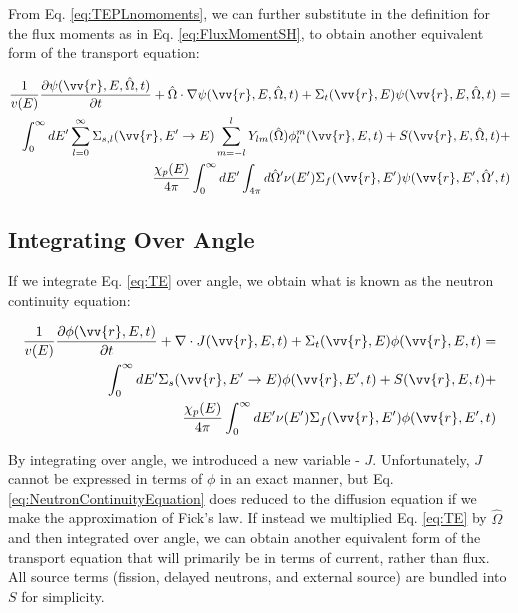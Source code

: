 \documentclass[10pt]{article}
\newcommand{\hO}{\hat{\Omega}}
\begin{document}
\begin{flushleft}
From Eq. \eqref{eq:TEPLnomoments}, we can further substitute in the definition for the flux moments as in Eq. \ref{eq:FluxMomentSH},  to obtain another equivalent form of the transport equation:

\begin{equation}
\label{eq:TEPL}
\begin{aligned}
\frac{1}{v(E)} \frac{\partial\psi(\vv{r}, E, \hO  ,t)}{\partial t} +
 \hO  \cdot\nabla\psi(\vv{r}, E, \hO  ,t) + 
 \Sigma_t(\vv{r},E)\psi(\vv{r}, E, \hO  ,t) = \\
 \int_{0}^{\infty}dE' \sum_{l=0}^{\infty} \Sigma_{s,l}(\vv{r}, E'\rightarrow E) \sum_{m=-l}^{l} Y_{lm}(\hO  )\phi_l^m(\vv{r}, E, t) + S(\vv{r}, E, \hO  ,t)+\\
\frac{\chi_p(E)}{4\pi} \int_{0}^{\infty} dE'\int_{4\pi}^{} d\hO  '\nu(E')\Sigma_f(\vv{r}, E')\psi(\vv{r}, E', \hO  ',t)\\
\end{aligned}
\end{equation}

\subsection{Integrating Over Angle}

 If we integrate Eq. \ref{eq:TE} over angle, we obtain what is known as the neutron continuity equation:

\begin{equation}
\label{eq:NeutronContinuityEquation}
\begin{aligned}
\frac{1}{v(E)} \frac{\partial\phi(\vv{r}, E, t)}{\partial t} +
 \nabla\cdot J(\vv{r}, E, t) + 
 \Sigma_t(\vv{r},E)\phi(\vv{r}, E, t) = \\
 \int_{0}^{\infty}dE' \Sigma_s(\vv{r}, E'\rightarrow E)\phi(\vv{r}, E', t) + S(\vv{r}, E, t)+\\
 \frac{\chi_p(E)}{4\pi} \int_{0}^{\infty} dE'\nu(E')\Sigma_f(\vv{r}, E')\phi(\vv{r}, E',t)
\end{aligned}
\end{equation}

By integrating over angle, we introduced a new variable - \(J\). Unfortunately, \(J\) cannot be expressed in terms of \(\phi\) in an exact manner, but Eq. \ref{eq:NeutronContinuityEquation} does reduced to the diffusion equation if we make the approximation of Fick's law. If instead we multiplied Eq. \ref{eq:TE} by \(\hO  \) and then integrated over angle, we can obtain another equivalent form of the transport equation that will primarily be in terms of current, rather than flux. All source terms (fission, delayed neutrons, and external source) are bundled into \(S\) for simplicity. 


\end{flushleft}
\end{document}
